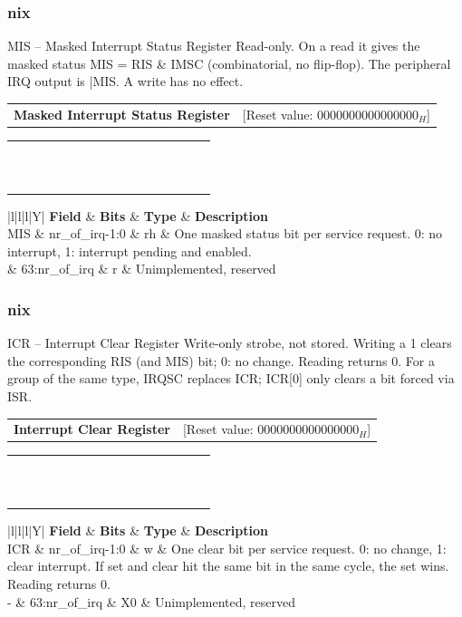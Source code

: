 \documentclass{beamer}
\makeatletter
\newcommand{\astitle}{nix}
\newcommand{\assubtitle}{nix}
\newcommand{\asregkopf}[2]{%
{\scriptsize
\begin{tabularx}{\textwidth}{@{}Xr@{}}
  \textbf{#1} & [Reset value: {#2}]
\end{tabularx}}\par}
\newcommand{\asregfourxsixteen}[8]{%
{\tiny\setlength{\tabcolsep}{1pt}\renewcommand{\arraystretch}{0.95}%
\begin{tabularx}{\textwidth}{|*{16}{>{\centering\arraybackslash}X|}}
  \hline
  63 & 62 & 61 & 60 & 59 & 58 & 57 & 56 & 55 & 54 & 53 & 52 & 51 & 50 & 49 & 48 \\
  \hline
  #1 \\
  \hline
  #2 \\
  \hline
  \hline
  47 & 46 & 45 & 44 & 43 & 42 & 41 & 40 & 39 & 38 & 37 & 36 & 35 & 34 & 33 & 32 \\
  \hline
  #3 \\
  \hline
  #4 \\
  \hline
  \hline
  31 & 30 & 29 & 28 & 27 & 26 & 25 & 24 & 23 & 22 & 21 & 20 & 19 & 18 & 17 & 16 \\
  \hline
  #5 \\
  \hline
  #6 \\
  \hline
  \hline
  15 & 14 & 13 & 12 & 11 & 10 & 09 & 08 & 07 & 06 & 05 & 04 & 03 & 02 & 01 & 00 \\
  \hline
  #7 \\
  \hline
  #8 \\
  \hline
\end{tabularx}}\par}
\newcommand{\asregdesc}[1]{%
{\tiny\renewcommand{\arraystretch}{1.1}%
\begin{tabularx}{\dimexpr\textwidth-1.1cm\relax}{|l|l|l|Y|}
  \hline
  \textbf{Field} & \textbf{Bits} & \textbf{Type} & \textbf{Description} \\
  \hline
  #1 \\
  \hline
\end{tabularx}}\par}
\newcommand{\asrow}[1]{\multicolumn{16}{|c|}{#1}}
\makeatother
\begin{document}
\renewcommand{\assubtitle}{MIS -- Masked Interrupt Status Register}
\begin{frame}
\frametitle{\astitle}
\begin{block}{\assubtitle}
{\tiny Read-only. On a read it gives the masked status MIS = RIS \& IMSC
(combinatorial, no flip-flop). The peripheral IRQ output is |MIS. A write has no effect.}
\vspace{2pt}
\asregkopf{Masked Interrupt Status Register}{$0000000000000000_H$}
\asregfourxsixteen{\asrow{0}}{\asrow{r}}
                  {\asrow{0}}{\asrow{r}}
                  {\asrow{0}}{\asrow{r}}
                  {\multicolumn{16}{|c|}{0 / MIS}}{\multicolumn{16}{|c|}{r / rh}}
\vspace{2pt}
\asregdesc{MIS & nr\_of\_irq-1:0 & rh & One masked status bit per service request. 0: no interrupt, 1: interrupt pending and enabled. \\
           \hline
           0 & 63:nr\_of\_irq & r & Unimplemented, reserved}
\end{block}
\end{frame}

\renewcommand{\assubtitle}{ICR -- Interrupt Clear Register}
\begin{frame}
\frametitle{\astitle}
\begin{block}{\assubtitle}
{\tiny Write-only strobe, not stored. Writing a 1 clears the corresponding RIS
(and MIS) bit; 0: no change. Reading returns 0. For a group of the same type, IRQSC
replaces ICR; ICR[0] only clears a bit forced via ISR.}
\vspace{2pt}
\asregkopf{Interrupt Clear Register}{$0000000000000000_H$}
\asregfourxsixteen{\asrow{-}}{\asrow{X0}}
                  {\asrow{-}}{\asrow{X0}}
                  {\asrow{-}}{\asrow{X0}}
                  {\multicolumn{16}{|c|}{- / ICR}}{\multicolumn{16}{|c|}{X0 / w}}
\vspace{2pt}
\asregdesc{ICR & nr\_of\_irq-1:0 & w & One clear bit per service request. 0: no change, 1: clear interrupt. If set and clear hit the same bit in the same cycle, the set wins. Reading returns 0. \\
           \hline
           - & 63:nr\_of\_irq & X0 & Unimplemented, reserved}
\end{block}
\end{frame}
\end{document}
